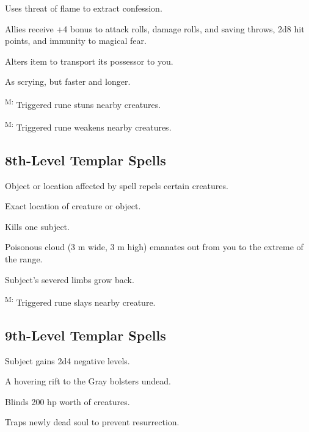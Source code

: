  Uses threat of flame to extract confession.

 Allies receive +4 bonus to attack rolls, damage rolls, and saving throws, 2d8 hit points, and immunity to magical fear.

 Alters item to transport its possessor to you.

 As scrying, but faster and longer.

\textsuperscript{M:} Triggered rune stuns nearby creatures.

\textsuperscript{M:} Triggered rune weakens nearby creatures.



\subsection{8th-Level Templar Spells}

 Object or location affected by spell repels certain creatures.

 Exact location of creature or object.

 Kills one subject.

 Poisonous cloud (3 m wide, 3 m high) emanates out from you to the extreme of the range.

 Subject's severed limbs grow back.

\textsuperscript{M:} Triggered rune slays nearby creature.



\subsection{9th-Level Templar Spells}

 Subject gains 2d4 negative levels.

 A hovering rift to the Gray bolsters
undead.

 Blinds 200 hp worth of creatures.

 Traps newly dead soul to prevent
resurrection.